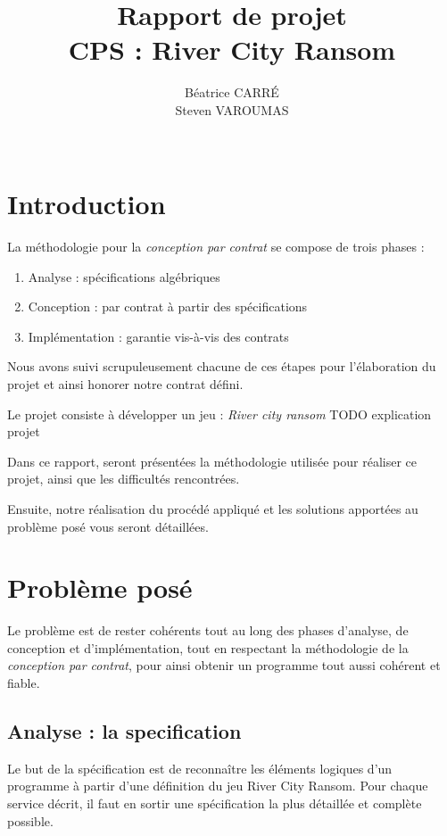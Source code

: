 \documentclass[a4paper, 11pt, notitlepage]{article}
\title{
  \huge Rapport de projet \\
  \huge CPS : River City Ransom\\
}
\author{
  Béatrice CARR\'E \\
  Steven VAROUMAS \\
  \\
}
\begin{document}
\maketitle
\section*{Introduction}
La méthodologie pour la \emph{conception par contrat}  se compose de trois phases :
\begin{enumerate}
\item Analyse : spécifications algébriques 
\item Conception : par contrat à partir des spécifications
\item Implémentation : garantie vis-à-vis des contrats
\end{enumerate}
Nous avons suivi scrupuleusement chacune de ces étapes pour l'élaboration du
projet et ainsi honorer notre contrat défini. 

Le projet consiste à développer un jeu : \emph{River city ransom}
TODO explication projet

Dans ce rapport, seront présentées la méthodologie utilisée pour
réaliser ce projet, ainsi que les difficultés rencontrées.
 
Ensuite, notre réalisation du procédé appliqué
et les solutions apportées au problème posé vous seront détaillées.







\section{Problème posé}
Le problème est de rester cohérents tout au long des phases d'analyse,
de conception et d'implémentation, tout en respectant la méthodologie de la \emph{conception par contrat},
pour ainsi obtenir un programme tout aussi cohérent et fiable.

\subsection{Analyse : la specification}
Le but de la spécification est de reconnaître les éléments logiques
d’un programme à partir d’une définition du jeu River City Ransom.
Pour chaque service décrit, il faut en sortir une spécification la
plus détaillée et complète possible.
\end{document}
